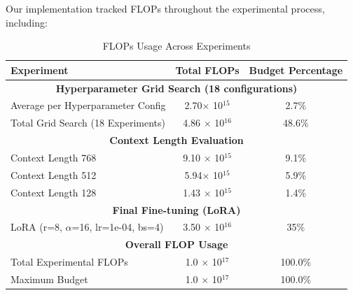 \documentclass{article}
\begin{document}
Our implementation tracked FLOPs throughout the experimental process, including:
\begin{table}[H]
    \centering
    \begin{tabular}{lcc}
    \hline
    \textbf{Experiment} & \textbf{Total FLOPs} & \textbf{Budget Percentage} \\
    \hline
    \multicolumn{3}{c}{\textbf{Hyperparameter Grid Search (18 configurations)}} \\
    \hline
    Average per Hyperparameter Config & 2.70$\times$ 10$^{15}$ & 2.7\% \\
    Total Grid Search (18 Experiments) & 4.86 $\times$ 10$^{16}$ & 48.6\% \\
    \hline
    \multicolumn{3}{c}{\textbf{Context Length Evaluation}} \\
    \hline
    Context Length 768 & 9.10 $\times$ 10$^{15}$ & 9.1\% \\
    Context Length 512 & 5.94$\times$ 10$^{15}$ & 5.9\% \\
    Context Length 128 & 1.43 $\times$ 10$^{15}$ & 1.4\% \\
    \hline
    \multicolumn{3}{c}{\textbf{Final Fine-tuning (LoRA)}} \\
    \hline
    LoRA (r=8, $\alpha$=16, lr=1e-04, bs=4) & 3.50 $\times$ 10$^{16}$ & 35\% \\
    \hline
    \multicolumn{3}{c}{\textbf{Overall FLOP Usage}} \\
    \hline
    Total Experimental FLOPs & 1.0 $\times$ 10$^{17}$ & 100.0\% \\
    Maximum Budget & 1.0 $\times$ 10$^{17}$ & 100.0\% \\
    \hline
    \end{tabular}
    \caption{FLOPs Usage Across Experiments}
    \label{tab:flops_usage}
    \end{table}
    



\end{document}
